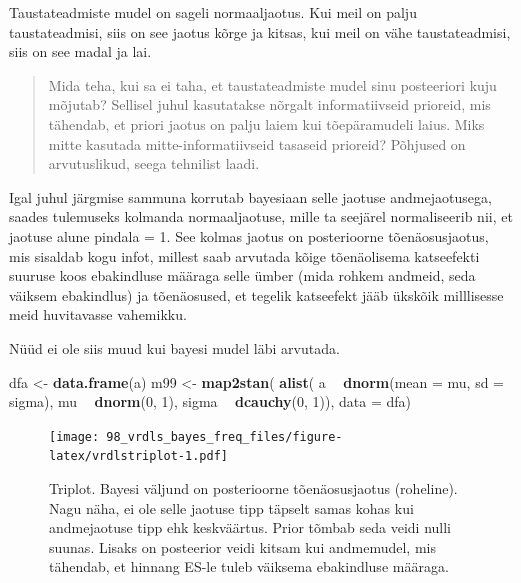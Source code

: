 \documentclass[]{book}
\newenvironment{Shaded}{\begin{snugshade}}{\end{snugshade}}
\newcommand{\DataTypeTok}[1]{\textcolor[rgb]{0.13,0.29,0.53}{#1}}
\newcommand{\DecValTok}[1]{\textcolor[rgb]{0.00,0.00,0.81}{#1}}
\newcommand{\KeywordTok}[1]{\textcolor[rgb]{0.13,0.29,0.53}{\textbf{#1}}}
\newcommand{\NormalTok}[1]{#1}
\newcommand{\OperatorTok}[1]{\textcolor[rgb]{0.81,0.36,0.00}{\textbf{#1}}}
\newcommand{\StringTok}[1]{\textcolor[rgb]{0.31,0.60,0.02}{#1}}
\begin{document}
Taustateadmiste mudel on sageli normaaljaotus.
Kui meil on palju taustateadmisi, siis on see jaotus kõrge ja kitsas, kui meil on vähe taustateadmisi, siis on see madal ja lai.

\begin{quote}
Mida teha, kui sa ei taha, et taustateadmiste mudel sinu posteeriori kuju mõjutab? Sellisel juhul kasutatakse nõrgalt informatiivseid prioreid, mis tähendab, et priori jaotus on palju laiem kui tõepäramudeli laius. Miks mitte kasutada mitte-informatiivseid tasaseid prioreid? Põhjused on arvutuslikud, seega tehnilist laadi.
\end{quote}

Igal juhul järgmise sammuna korrutab bayesiaan selle jaotuse andmejaotusega, saades tulemuseks kolmanda normaaljaotuse, mille ta seejärel normaliseerib nii, et jaotuse alune pindala = 1.
See kolmas jaotus on posterioorne tõenäosusjaotus, mis sisaldab kogu infot, millest saab arvutada kõige tõenäolisema katseefekti suuruse koos ebakindluse määraga selle ümber (mida rohkem andmeid, seda väiksem ebakindlus) ja tõenäosused, et tegelik katseefekt jääb ükskõik milllisesse meid huvitavasse vahemikku.

Nüüd ei ole siis muud kui bayesi mudel läbi arvutada.

\begin{Shaded}
\begin{Highlighting}[]
\NormalTok{dfa <-}\StringTok{ }\KeywordTok{data.frame}\NormalTok{(a)}
\NormalTok{m99 <-}\StringTok{ }\KeywordTok{map2stan}\NormalTok{(}
  \KeywordTok{alist}\NormalTok{(}
\NormalTok{    a }\OperatorTok{~}\StringTok{ }\KeywordTok{dnorm}\NormalTok{(}\DataTypeTok{mean =}\NormalTok{ mu, }\DataTypeTok{sd =}\NormalTok{ sigma),}
\NormalTok{    mu  }\OperatorTok{~}\StringTok{ }\KeywordTok{dnorm}\NormalTok{(}\DecValTok{0}\NormalTok{, }\DecValTok{1}\NormalTok{), }
\NormalTok{    sigma }\OperatorTok{~}\StringTok{ }\KeywordTok{dcauchy}\NormalTok{(}\DecValTok{0}\NormalTok{, }\DecValTok{1}\NormalTok{)), }
  \DataTypeTok{data =}\NormalTok{ dfa)}
\end{Highlighting}
\end{Shaded}

\begin{figure}
\centering
\texttt{[image: 98\_vrdls\_bayes\_freq\_files/figure-latex/vrdlstriplot-1.pdf]}
\caption{\label{fig:vrdlstriplot}Triplot. Bayesi väljund on posterioorne tõenäosusjaotus (roheline). Nagu näha, ei ole selle jaotuse tipp täpselt samas kohas kui andmejaotuse tipp ehk keskväärtus. Prior tõmbab seda veidi nulli suunas. Lisaks on posteerior veidi kitsam kui andmemudel, mis tähendab, et hinnang ES-le tuleb väiksema ebakindluse määraga.}
\end{figure}
\end{document}
